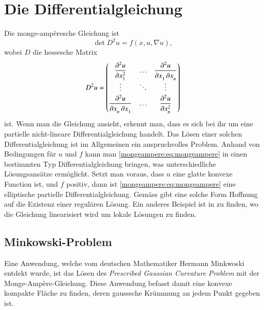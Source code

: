 %
%
%
%
\section{Die Differentialgleichung\label{mongeampere:section:teil0}}
Die monge-ampèresche Gleichung ist
\begin{equation}
  \det D^2 u = f(x, u, \nabla u),
  \label{mongeampere:eq:mongeampere}
\end{equation}
wobei $D$ die hessesche Matrix
\begin{equation*}
  D^2 u =
\renewcommand{\arraystretch}{1.7}
  \begin{pmatrix}
    \displaystyle \frac{\partial^2 u}{\partial x_{1\mathstrut}^2\mathstrut}
	& \dots
		&\displaystyle \frac{\partial^2 u}{\partial x_{1\mathstrut}^{\phantom{2}} \,\partial x_{n\mathstrut}^{\phantom{2}}\mathstrut} \\[-2pt]
  \vdots & \ddots & \vdots \\
  \displaystyle \frac{\partial^2 u}{\partial x_{n\mathstrut}^{\phantom{2}} \,\partial x_{1\mathstrut}^{\phantom{2}}\mathstrut}
	& \dots
		&\displaystyle \frac{\partial^2 u}{\partial x_{n\mathstrut}^2\mathstrut} \\
  \end{pmatrix}
\end{equation*}
ist.
Wenn man die Gleichung ansieht, erkennt man, dass es sich bei ihr um eine partielle
nicht-lineare Differentialgleichung handelt.
Das Lösen einer solchen Differentialgleichung ist im Allgemeinen ein anspruchvolles Problem.
Anhand von Bedingungen für $u$ und $f$ kann man \eqref{mongeampere:eq:mongeampere} 
in einen bestimmten Typ Differentialgleichung bringen, was unterschiedliche Lösungsansätze ermöglicht.
Setzt man voraus, dass $u$ eine glatte konvexe Function ist, und $f$ positiv, dann ist \eqref{mongeampere:eq:mongeampere}
eine elliptische partielle Differentialgleichung.
%
Gemäss \cite{mongeampere:figalli2018mongeampereequation} gibt eine solche Form Hoffnung auf die Existenz einer regulären Lösung.
Ein anderes Beispiel ist in \cite{mongeampere:figalli2022prescribednegativegausscurvature} zu finden, wo die 
Gleichung linearisiert wird um lokale Lösungen zu finden.

\subsection{Minkowski-Problem}
%
Eine Anwendung, welche vom deutschen Mathematiker Hermann Minkwoski entdekt wurde, ist das Lösen des
%
\emph{Prescribed Gaussian Curvature Problem} mit der Monge-Ampère-Gleichung.
%
Diese Anwendung befasst damit eine konvexe kompakte Fläche zu finden, deren gausssche Krümmung 
an jedem Punkt gegeben ist.

